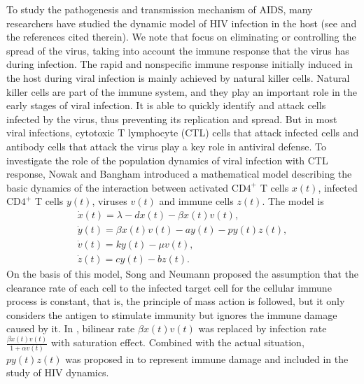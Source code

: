 \documentclass[reqno]{amsart}
\begin{document}
To  study the pathogenesis and transmission mechanism of AIDS, many researchers 
have studied the dynamic model of HIV infection in the host
(see \cite{LW2, NA, NB, Sa, WL} and the references cited therein).
 We note that \cite{NA} focus on eliminating or controlling the spread of the virus, 
taking into account the immune response that the virus has during
infection. The rapid and nonspecific immune response initially induced in the host 
during viral infection is mainly achieved by natural killer cells. 
Natural killer cells are part of the immune system,
and they play an important role in the early stages of viral infection. 
It is able to quickly identify and attack cells infected by the virus, thus 
preventing its  replication and spread. 
But in most viral infections, cytotoxic T lymphocyte (CTL) cells that attack infected 
cells and antibody cells that attack the virus play a  key role in antiviral defense. 
To investigate the role of the population dynamics of viral infection with 
CTL response, Nowak and Bangham \cite{NB} introduced a  mathematical model describing 
the basic dynamics of the interaction between activated CD$4^{+}$ T cells $x(t)$, 
infected CD$4^{+}$ T cells $y(t)$, viruses  $v(t)$ and
 immune cells $z(t)$. The model is 
\begin{equation}\label{1.2}
\begin{gathered}
\dot{x}(t)=\lambda-dx(t)-\beta x(t)v(t),\\
\dot{y}(t)=\beta x(t)v(t)-ay(t)-py(t)z(t),\\
\dot{v}(t)=ky(t)-\mu v(t),\\
\dot{z}(t)=cy(t)-bz(t).
\end{gathered}
\end{equation}
On the basis of this model, Song and Neumann \cite{SN} proposed the 
assumption that the clearance rate of each cell to the infected target cell for the 
cellular immune process is constant, that is, the principle of mass action is followed, 
but it only considers the antigen to stimulate immunity but ignores the immune damage 
caused by it. In  \cite{SN}, bilinear rate $\beta x(t)v(t)$ was replaced by infection 
rate $\frac{\beta x(t)v(t)}{1+\alpha v(t)}$ with saturation effect. Combined with
the actual situation, $py(t)z(t)$ was proposed in \cite{HZ,QJ, RW} to represent immune 
damage and included in the study of HIV dynamics. 
\end{document}
